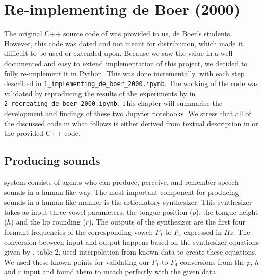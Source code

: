 \chapter{Re-implementing de Boer (2000)}
\label{ch:reimplementing}

The original C++ source code of \citet{deBoer2000} was provided to us, de Boer's students.
However, this code was dated and not meant for distribution, which made it difficult to be used or extended upon.
Because we saw the value in a well documented and easy to extend implementation of this project, we decided to fully re-implement it in Python.
This was done incrementally, with each step described in \texttt{1\_implementing\_de\_boer\_2000.ipynb}.
The working of the code was validated by reproducing the results of the experiments by \citet{deBoer2000} in \texttt{2\_recreating\_de\_boer\_2000.ipynb}.
This chapter will summarise the development and findings of these two Jupyter notebooks.
We stress that all of the discussed code in what follows is either derived from textual description in \citet{deBoer2000} or the provided C++ code.


\section{Producing sounds}
\label{sec:reimplementing_producing}

\citet{deBoer2000} system consists of agents who can produce, perceive, and remember speech sounds in a human-like way.
The most important component for producing sounds in a human-like manner is the articulatory synthesizer.
This synthesizer takes as input three vowel parameters: the tongue position ($p$), the tongue height ($h$) and the lip rounding ($r$).
The outputs of the synthesizer are the first four formant frequencies of the corresponding vowel: $F_1$ to $F_4$ expressed in $Hz$.
The conversion between input and output happens based on the synthesizer equations given by \citet{deBoer2000}, table 2.
 used interpolation from known data to create these equations.
We used these known points for validating our $F_1$ to $F_4$ conversions from the $p$, $h$ and $r$ input and found them to match perfectly with the given data.

